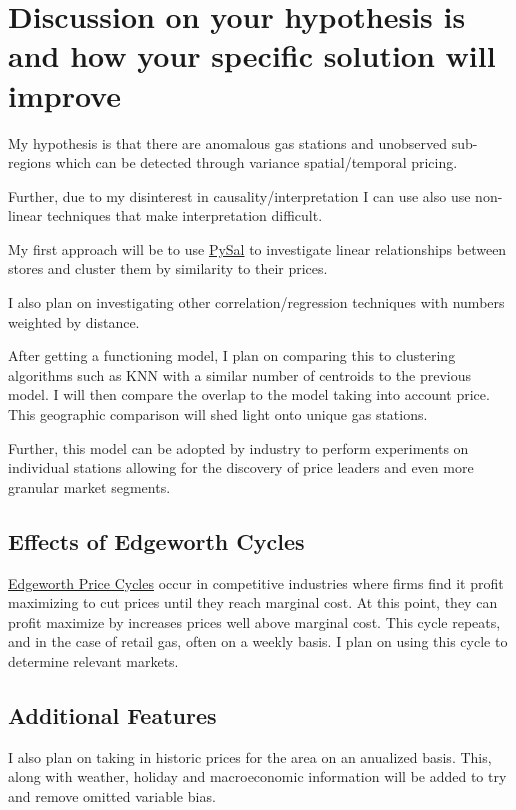 \documentclass[11pt]{article}
\begin{document}
\section{Discussion on your hypothesis is and how your specific solution will improve}
\label{sec:org9e342aa}

My hypothesis is that there are anomalous gas stations and unobserved
sub-regions which can be detected through variance spatial/temporal pricing.

Further, due to my disinterest in causality/interpretation I can use also use
non-linear techniques that make interpretation difficult.

My first approach will be to use \href{https://www.earthdatascience.org/tutorials/intro-to-spatial-regression/}{PySal} to investigate linear relationships
between stores and cluster them by similarity to their prices.

I also plan on investigating other correlation/regression techniques with
numbers weighted by distance.

After getting a functioning model, I plan on comparing this to clustering
algorithms such as KNN with a similar number of centroids to the previous model.
I will then compare the overlap to the model taking into account price. This
geographic comparison will shed light onto unique gas stations.

Further, this model can be adopted by industry to perform experiments on
individual stations allowing for the discovery of price leaders and even more
granular market segments.

\subsection{Effects of Edgeworth Cycles}
\label{sec:orgcf1686a}

\href{https://en.wikipedia.org/wiki/Edgeworth\_price\_cycle}{Edgeworth Price Cycles} occur in competitive industries where firms find it
profit maximizing to cut prices until they reach marginal cost. At this point,
they can profit maximize by increases prices well above marginal cost. This
cycle repeats, and in the case of retail gas, often on a weekly basis. I plan on
using this cycle to determine relevant markets. 

\subsection{Additional Features}
\label{sec:org6637e38}
I also plan on taking in historic prices for the area on an anualized basis.
This, along with weather, holiday and macroeconomic information will be added
to try and remove omitted variable bias.
\end{document}

